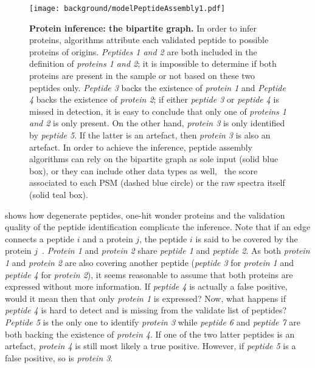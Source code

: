 \begin{figure}[!htb]
    \texttt{[image: background/modelPeptideAssembly1.pdf]}\centering
    \vspace{-0.2mm}
    \caption[Protein inference: the bipartite graph]{\label{fig:bipartite}%
    \textbf{Protein inference: the bipartite graph.} In order to infer proteins,
    algorithms attribute each validated peptide to possible proteins of origins.
    \textit{Peptides 1 and 2} are both included in the definition of
    \textit{proteins 1 and 2};
    it is impossible to determine if both proteins are present in the sample or
    not based on these two peptides only.
    \textit{Peptide 3} backs the existence of \textit{protein 1} and
    \textit{Peptide 4} backs the existence of \textit{protein 2};
    if either \textit{peptide 3} or \textit{peptide 4} is missed in detection,
    it is easy to conclude that only one of \textit{proteins 1 and 2}
    is only present.
    On the other hand, \textit{protein 3} is only identified by \textit{peptide 5}.
    If the latter is an artefact, then \textit{protein 3} is also an artefact.
    In order to achieve the inference,
    peptide assembly algorithms can rely on
    the bipartite graph as sole input (solid blue box),
    or they can include other data types as well,
    \eg\ the score associated to each \gls{PSM} (dashed blue circle) or
    the raw spectra itself (solid teal box).
    }
\end{figure}

 shows how degenerate peptides, one-hit wonder proteins
and the validation quality of the peptide identification
complicate the inference.
Note that if an edge connects a peptide $i$ and a protein $j$,
the peptide $i$ is said to be covered by the protein $j$~.
\textit{Protein 1} and \textit{protein 2} share
\textit{peptide 1} and \textit{peptide 2}.
As both \textit{protein 1} and \textit{protein 2} are also covering
another peptide (\textit{peptide 3} for \textit{protein 1}
and \textit{peptide 4} for \textit{protein 2}),
it seems reasonable to assume that both proteins are expressed without more information.
If \textit{peptide 4} is actually a false positive,
would it mean then that only \textit{protein 1} is expressed?
Now, what happens if \textit{peptide 4} is hard to detect and
is missing from the validate list of peptides?
\textit{Peptide 5} is the only one to identify \textit{protein 3}
while \textit{peptide 6} and \textit{peptide 7} are
both backing the existence of \textit{protein 4}.
If one of the two latter peptides is an artefact,
\textit{protein 4} is still most likely a true positive.
However, if \textit{peptide 5} is a false positive,
so is \textit{protein 3}.\mybr\

